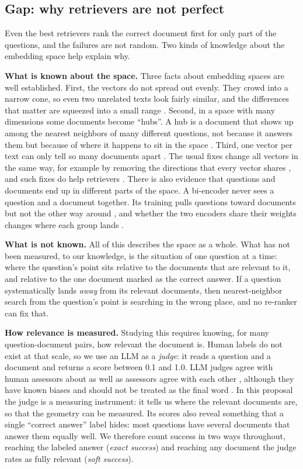 \documentclass[12pt,a4paper]{article}
\begin{document}
\subsection{Gap: why retrievers are not perfect}

Even the best retrievers rank the correct document first for only part of the questions, and the failures are not random. Two kinds of knowledge about the embedding space help explain why.

\textbf{What is known about the space.} Three facts about embedding spaces are well established. First, the vectors do not spread out evenly. They crowd into a narrow cone, so even two unrelated texts look fairly similar, and the differences that matter are squeezed into a small range \citep{ethayarajh2019contextual}. Second, in a space with many dimensions some documents become ``hubs''. A hub is a document that shows up among the nearest neighbors of many different questions, not because it answers them but because of where it happens to sit in the space \citep{radovanovic2010hubs}. Third, one vector per text can only tell so many documents apart \citep{luan2021sparse}. The usual fixes change all vectors in the same way, for example by removing the directions that every vector shares \citep{mu2018allbutthetop}, and such fixes do help retrievers \citep{jung2023isotropic}. There is also evidence that questions and documents end up in different parts of the space. A bi-encoder never sees a question and a document together. Its training pulls questions toward documents but not the other way around \citep{li2021dance}, and whether the two encoders share their weights changes where each group lands \citep{dong2022dualencoder}.

\textbf{What is not known.} All of this describes the space as a whole. What has not been measured, to our knowledge, is the situation of one question at a time: where the question's point sits relative to the documents that are relevant to it, and relative to the one document marked as the correct answer. If a question systematically lands \emph{away} from its relevant documents, then nearest-neighbor search from the question's point is searching in the wrong place, and no re-ranker can fix that.

\textbf{How relevance is measured.} Studying this requires knowing, for many question-document pairs, how relevant the document is. Human labels do not exist at that scale, so we use an LLM as a \emph{judge}: it reads a question and a document and returns a score between 0.1 and 1.0. LLM judges agree with human assessors about as well as assessors agree with each other \citep{thomas2024llmjudge,upadhyay2024umbrela}, although they have known biases and should not be treated as the final word \citep{soboroff2024cantreplace}. In this proposal the judge is a measuring instrument: it tells us where the relevant documents are, so that the geometry can be measured. Its scores also reveal something that a single ``correct answer'' label hides: most questions have several documents that answer them equally well. We therefore count success in two ways throughout, reaching the labeled answer (\emph{exact success}) and reaching any document the judge rates as fully relevant (\emph{soft success}).
\end{document}
